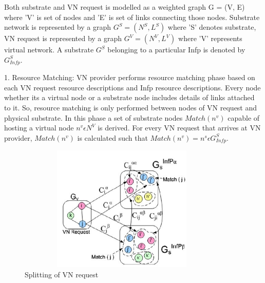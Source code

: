 \documentclass[article,dr=phil,type=msc ,colorback,accentcolor=tud4b]{tudthesis}
\begin{document}
Both substrate and VN request is modelled as a weighted graph G = (V, E) where 'V' is set of nodes and 'E' is set of links connecting those nodes. Substrate network is represented by a graph $G^{S} = (N^{S}, L^{S})$ where 'S' denotes substrate, VN request is represented by a graph $G^{V} = (N^{V}, L^{V})$ where 'V' represents virtual network. A substrate $G^{S}$ belonging to a particular Infp is denoted by $G^{S}_{Infp}$.\newline

1. Resource Matching: VN provider performs resource matching phase based on each VN request resource descriptions and Infp resource descriptions. Every node whether its a virtual node or a substrate node includes details of links attached to it. So, resource matching is only performed between nodes of VN request and physical substrate. 	In this phase a set of substrate nodes $Match(n^{v})$ capable of hosting a virtual node $n^{v} \epsilon N^{V}$ is derived. For every VN request that arrives at VN provider, $Match(n^{v})$ is calculated such that $Match(n^{v}) = {n^{s}} \epsilon G^{S}_{Infp}$.\newline

\begin{figure}[h]
	\centering
	\includegraphics[width=10cm, height=6cm]{vn_splitting.jpg}
	\caption{Splitting of VN request}
	\label{fig: VN splitting}
\end{figure}
\end{document}
